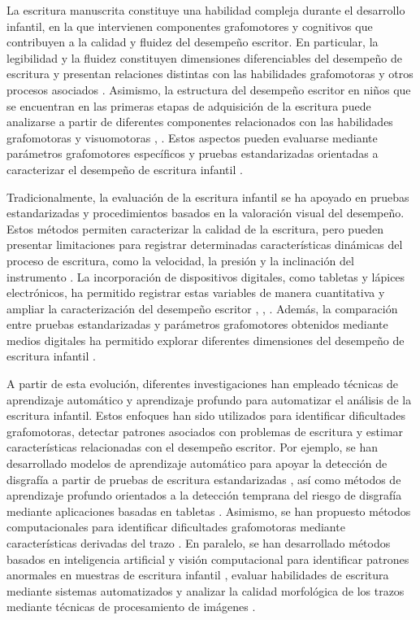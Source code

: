 \documentclass{iaesarticle}
\begin{document}
La escritura manuscrita constituye una habilidad compleja durante el desarrollo infantil, en la que intervienen componentes grafomotores y cognitivos que contribuyen a la calidad y fluidez del desempeño escritor. En particular, la legibilidad y la fluidez constituyen dimensiones diferenciables del desempeño de escritura y presentan relaciones distintas con las habilidades grafomotoras y otros procesos asociados \cite{Downing2023}. Asimismo, la estructura del desempeño escritor en niños que se encuentran en las primeras etapas de adquisición de la escritura puede analizarse a partir de diferentes componentes relacionados con las habilidades grafomotoras y visuomotoras \cite{Truxius2024}, \cite{Khatib2022}. Estos aspectos pueden evaluarse mediante parámetros grafomotores específicos y pruebas estandarizadas orientadas a caracterizar el desempeño de escritura infantil \cite{Sparaci2025}.

Tradicionalmente, la evaluación de la escritura infantil se ha apoyado en pruebas estandarizadas y procedimientos basados en la valoración visual del desempeño. Estos métodos permiten caracterizar la calidad de la escritura, pero pueden presentar limitaciones para registrar determinadas características dinámicas del proceso de escritura, como la velocidad, la presión y la inclinación del instrumento \cite{Asselborn2018}. La incorporación de dispositivos digitales, como tabletas y lápices electrónicos, ha permitido registrar estas variables de manera cuantitativa y ampliar la caracterización del desempeño escritor \cite{Asselborn2018}, \cite{Asselborn2020}, \cite{Philip2023}. Además, la comparación entre pruebas estandarizadas y parámetros grafomotores obtenidos mediante medios digitales ha permitido explorar diferentes dimensiones del desempeño de escritura infantil \cite{Sparaci2025}.

A partir de esta evolución, diferentes investigaciones han empleado técnicas de aprendizaje automático y aprendizaje profundo para automatizar el análisis de la escritura infantil. Estos enfoques han sido utilizados para identificar dificultades grafomotoras, detectar patrones asociados con problemas de escritura y estimar características relacionadas con el desempeño escritor. Por ejemplo, se han desarrollado modelos de aprendizaje automático para apoyar la detección de disgrafía a partir de pruebas de escritura estandarizadas \cite{Deschamps2021}, así como métodos de aprendizaje profundo orientados a la detección temprana del riesgo de disgrafía mediante aplicaciones basadas en tabletas \cite{Lomurno2023}. Asimismo, se han propuesto métodos computacionales para identificar dificultades grafomotoras mediante características derivadas del trazo \cite{Gavenciak2025}. En paralelo, se han desarrollado métodos basados en inteligencia artificial y visión computacional para identificar patrones anormales en muestras de escritura infantil \cite{Villegas-Ch2023}, evaluar habilidades de escritura mediante sistemas automatizados \cite{Inoue2025} y analizar la calidad morfológica de los trazos mediante técnicas de procesamiento de imágenes \cite{Villegas-Cubas2026}.
\end{document}
